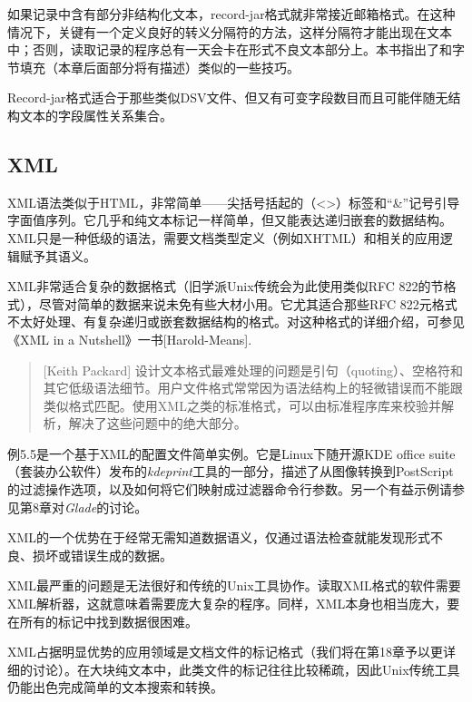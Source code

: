 \documentclass[12pt,oneside]{book}
\begin{document}
\begin{common-format}
如果记录中含有部分非结构化文本，record-jar格式就非常接近邮箱格式。在这种情况下，关键有一个定义良好的转义分隔符的方法，这样分隔符才能出现在文本中；否则，读取记录的程序总有一天会卡在形式不良文本部分上。本书指出了和字节填充（本章后面部分将有描述）类似的一些技巧。

Record-jar格式适合于那些类似DSV文件、但又有可变字段数目而且可能伴随无结构文本的字段属性关系集合。
 
\subsection{ XML}
XML语法类似于HTML，非常简单——尖括号括起的（<>）标签和“\&{}”记号引导字面值序列。它几乎和纯文本标记一样简单，但又能表达递归嵌套的数据结构。XML只是一种低级的语法，需要文档类型定义（例如XHTML）和相关的应用逻辑赋予其语义。

XML非常适合复杂的数据格式（旧学派Unix传统会为此使用类似RFC 822的节格式），尽管对简单的数据来说未免有些大材小用。它尤其适合那些RFC 822元格式不太好处理、有复杂递归或嵌套数据结构的格式。对这种格式的详细介绍，可参见《XML in a Nutshell》一书[Harold-Means].
\begin{quote}[Keith Packard]
设计文本格式最难处理的问题是引句（quoting）、空格符和其它低级语法细节。用户文件格式常常因为语法结构上的轻微错误而不能跟类似格式匹配。使用XML之类的标准格式，可以由标准程序库来校验并解析，解决了这些问题中的绝大部分。
\end{quote}

例5.5是一个基于XML的配置文件简单实例。它是Linux下随开源KDE office suite（套装办公软件）发布的\textit{kdeprint}工具的一部分，描述了从图像转换到PostScript的过滤操作选项，以及如何将它们映射成过滤器命令行参数。另一个有益示例请参见第8章对\textit{Glade}的讨论。

XML的一个优势在于经常无需知道数据语义，仅通过语法检查就能发现形式不良、损坏或错误生成的数据。

XML最严重的问题是无法很好和传统的Unix工具协作。读取XML格式的软件需要XML解析器，这就意味着需要庞大复杂的程序。同样，XML本身也相当庞大，要在所有的标记中找到数据很困难。

XML占据明显优势的应用领域是文档文件的标记格式（我们将在第18章予以更详细的讨论）。在大块纯文本中，此类文件的标记往往比较稀疏，因此Unix传统工具仍能出色完成简单的文本搜索和转换。


\end{common-format}
\end{document}
